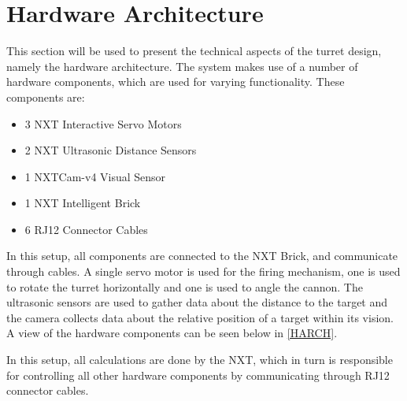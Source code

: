 \section{Hardware Architecture}
This section will be used to present the technical aspects
of the turret design, namely the hardware architecture. The \name system makes
use of a number of hardware components, which are used for varying
functionality. These components are:

\begin{itemize}
  \item 3 NXT Interactive Servo Motors
  \item 2 NXT Ultrasonic Distance Sensors
  \item 1 NXTCam-v4 Visual Sensor
  \item 1 NXT Intelligent Brick
  \item 6 RJ12 Connector Cables
\end{itemize}

In this setup, all components are connected to the NXT Brick, and communicate
through cables. A single servo motor is used for the firing mechanism, one
is used to rotate the turret horizontally and one is used to angle the
cannon. The ultrasonic sensors are used to gather data
about the distance to the target and the camera collects data about the
relative position of a target within its vision. A view of the hardware
components can be seen below in \autoref{HARCH}.


In this setup, all calculations are done by the NXT, which in turn is
responsible for controlling all other hardware components by communicating through RJ12
connector cables.